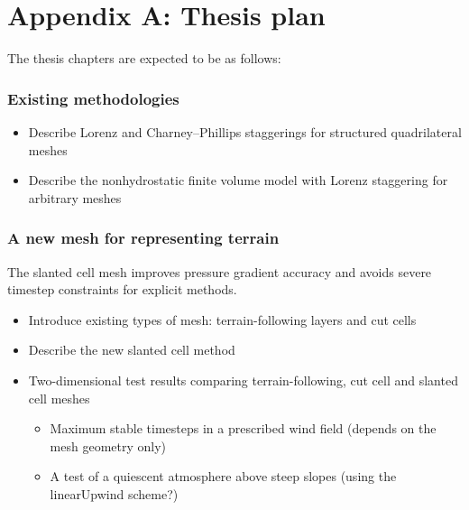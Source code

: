 \documentclass[a4paper,11pt]{article}
\begin{document}
\section*{Appendix A: Thesis plan}
The thesis chapters are expected to be as follows:

\subsubsection*{Existing methodologies}
\begin{itemize}[itemsep=0.1em]
	\item Describe Lorenz and Charney--Phillips staggerings for structured quadrilateral meshes
	\item Describe the nonhydrostatic finite volume model with Lorenz staggering for arbitrary meshes \citep{weller-shahrokhi2014}
\end{itemize}

\subsubsection*{A new mesh for representing terrain}
\noindent The slanted cell mesh improves pressure gradient accuracy and avoids severe timestep constraints for explicit methods.
\begin{itemize}[itemsep=0.1em]
	\item Introduce existing types of mesh: terrain-following layers and cut cells
	\item Describe the new slanted cell method
	\item {Two-dimensional test results comparing terrain-following, cut cell and slanted cell meshes
	\begin{itemize}[itemsep=0.1em,topsep=0pt]
		\item Maximum stable timesteps in a prescribed wind field (depends on the mesh geometry only)
		\item A test of a quiescent atmosphere above steep slopes (using the linearUpwind scheme?)
	\end{itemize}}
\end{itemize}
\end{document}
